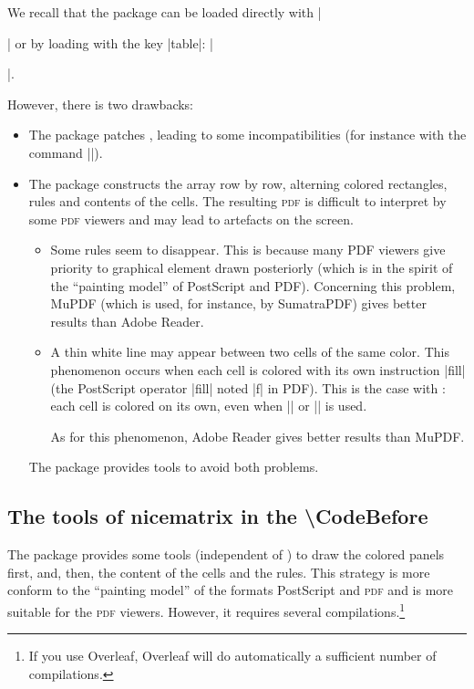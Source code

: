 \documentclass[dvipsnames]{article}%
\begin{document}

We recall that the package  can be loaded directly with
|\usepackage{colortbl}| or by loading  with the key |table|:
|\usepackage[table]{xcolor}|. 

\medskip
However, there is two drawbacks:
\begin{itemize}
\item The package  patches , leading to some
incompatibilities (for instance with the command |\hdotsfor|).

\item The package  constructs the array row by row, alterning
colored rectangles, rules and contents of the cells. The resulting
\textsc{pdf} is difficult to interpret by some \textsc{pdf} viewers and may
lead to artefacts on the screen.
\begin{itemize}
\item Some rules seem to disappear. This is because many PDF viewers give
priority to graphical element drawn posteriorly (which is in the spirit of the
``painting model'' of PostScript and PDF). Concerning this problem, MuPDF
(which is used, for instance, by SumatraPDF) gives better results than Adobe
Reader.
\item A thin white line may appear between two cells of the same color. This
phenomenon occurs when each cell is colored with its own instruction |fill|
(the PostScript operator |fill| noted |f| in PDF). This is the case with
: each cell is colored on its own, even when |\columncolor| or
|\rowcolor| is used.

As for this phenomenon, Adobe Reader gives better results than MuPDF.
\end{itemize}

The package  provides tools to avoid both problems.
\end{itemize}

\subsection{The tools of nicematrix in the \textbackslash CodeBefore}

\label{color-in-code-before}

The package  provides some tools (independent of )
to draw the colored panels first, and, then, the content of the cells and the
rules. This strategy is more conform to the ``painting model'' of the formats
PostScript and \textsc{pdf} and is more suitable for the \textsc{pdf} viewers.
However, it requires several compilations.\footnote{If you use Overleaf,
  Overleaf will do automatically a sufficient number of compilations.}
\end{document}
